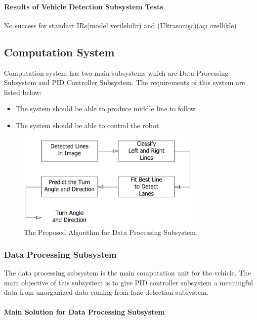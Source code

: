 \documentclass[a4paper,12pt]{article}
\begin{document}
	\paragraph{Results of Vehicle Detection Subsystem Tests}
	
		No success for standart IRs(model verilebilir) and (Ultrasonişc)(açı özellikle)		
		
	\subsection{Computation System}
	
	Computation system has two main subsystems which are Data Processing Subsystem and PID Controller Subsystem. The requirements of this system are listed below:
	\begin{itemize}
		\item The system should	be able to produce middle line to follow
		\item The system should be able to control the robot
	\end{itemize}	
	
		\begin{figure}[t]
		\center
		\setlength{\unitlength}{\textwidth} 
		\includegraphics[width=0.8\textwidth]{v-models/data_processing_subsystem}
		\caption{\label{fig:data_processing_subsystem}The Proposed Algorithm for Data Processing Subsystem.}
	\end{figure}
	\subsubsection{Data Processing Subsystem}
	
		The data processing subsystem is the main computation unit for the vehicle. The main objective of this subsystem is to give PID controller subsystem a meaningful data from unorganized data coming from lane detection subsystem. 
	
	\paragraph{Main Solution for Data Processing Subsystem}
	
\end{document}
